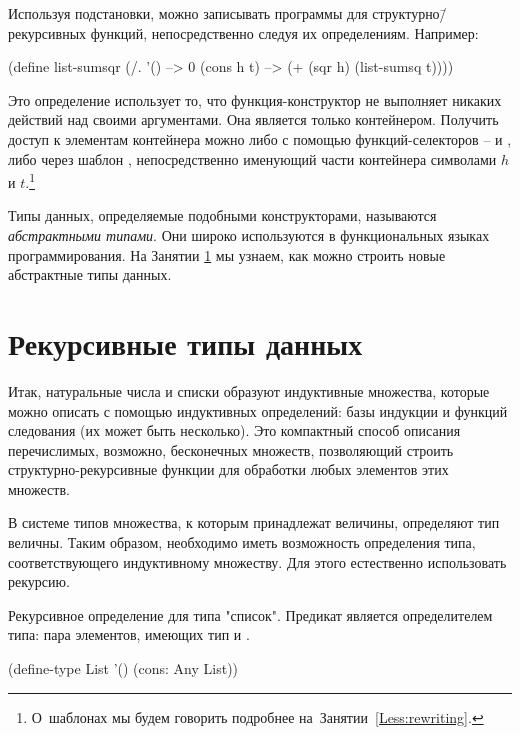 %
Используя подстановки, можно записывать программы для структурно\=/рекурсивных функций, непосредственно следуя их определениям. Например:

\begin{SchemeCode}[emph={h,t}]
(define list-sumsqr
  (/. '() --> 0
      (cons h t) --> (+ (sqr h) (list-sumsq t))))
\end{SchemeCode}

Это определение использует то, что функция-конструктор  не выполняет никаких действий над своими аргументами. Она является только контейнером. Получить доступ к элементам контейнера можно либо с помощью функций-селекторов --  и , либо через шаблон , непосредственно именующий части контейнера символами $h$ и $t$.\footnote{О~шаблонах мы будем говорить подробнее на~Занятии~\ref{Less:rewriting}.}

Типы данных, определяемые подобными конструкторами, называются \emph{абстрактными типами}. Они широко используются в функциональных языках программирования. На Занятии \ref{} мы узнаем, как можно строить новые абстрактные типы данных.

\section{Рекурсивные типы данных}
Итак, натуральные числа и списки образуют индуктивные множества, которые можно описать с помощью индуктивных определений: базы индукции и функций следования (их может быть несколько). Это компактный способ описания перечислимых, возможно, бесконечных множеств, позволяющий строить структурно-рекурсивные функции для обработки любых элементов этих множеств.

В системе типов \Scheme множества, к которым принадлежат величины, определяют тип величны. Таким образом, необходимо иметь возможность определения типа, соответствующего индуктивному множеству. Для этого естественно использовать рекурсию.

\begin{example}{Рекурсивное определение для типа "список". Предикат  является определителем типа: пара элементов, имеющих тип  и .}
\begin{SchemeCode}[emph={h,t}]
(define-type List
  '()
  (cons: Any List))
\end{SchemeCode}
\end{example}

